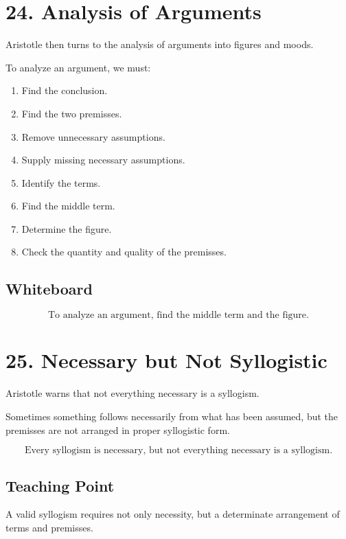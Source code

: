 \documentclass[12pt]{article}
\begin{document}
\section*{24. Analysis of Arguments}

Aristotle then turns to the analysis of arguments into figures and moods.

To analyze an argument, we must:

\begin{enumerate}[itemsep=0.25em]
    \item Find the conclusion.
    \item Find the two premisses.
    \item Remove unnecessary assumptions.
    \item Supply missing necessary assumptions.
    \item Identify the terms.
    \item Find the middle term.
    \item Determine the figure.
    \item Check the quantity and quality of the premisses.
\end{enumerate}

\subsection*{Whiteboard}

\[
\boxed{
\text{To analyze an argument, find the middle term and the figure.}
}
\]

\section*{25. Necessary but Not Syllogistic}

Aristotle warns that not everything necessary is a syllogism.

Sometimes something follows necessarily from what has been assumed, but the
premisses are not arranged in proper syllogistic form.

\[
\boxed{
\text{Every syllogism is necessary, but not everything necessary is a syllogism.}
}
\]

\subsection*{Teaching Point}

A valid syllogism requires not only necessity, but a determinate arrangement of
terms and premisses.
\end{document}
